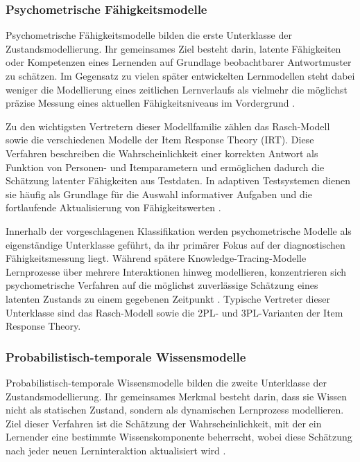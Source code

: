 \subsubsection{Psychometrische
Fähigkeitsmodelle}\label{psychometrische-fuxe4higkeitsmodelle}

Psychometrische Fähigkeitsmodelle bilden die erste Unterklasse der
Zustandsmodellierung. Ihr gemeinsames Ziel besteht darin, latente
Fähigkeiten oder Kompetenzen eines Lernenden auf Grundlage beobachtbarer
Antwortmuster zu schätzen. Im Gegensatz zu vielen später entwickelten
Lernmodellen steht dabei weniger die Modellierung eines zeitlichen
Lernverlaufs als vielmehr die möglichst präzise Messung eines aktuellen
Fähigkeitsniveaus im Vordergrund \citep{Han2018, Liu2024}.

Zu den wichtigsten Vertretern dieser Modellfamilie zählen das
Rasch-Modell sowie die verschiedenen Modelle der Item Response Theory
(IRT). Diese Verfahren beschreiben die Wahrscheinlichkeit einer
korrekten Antwort als Funktion von Personen- und Itemparametern und
ermöglichen dadurch die Schätzung latenter Fähigkeiten aus Testdaten. In
adaptiven Testsystemen dienen sie häufig als Grundlage für die Auswahl
informativer Aufgaben und die fortlaufende Aktualisierung von
Fähigkeitswerten \citep{Han2018, Liu2024}.

Innerhalb der vorgeschlagenen Klassifikation werden psychometrische
Modelle als eigenständige Unterklasse geführt, da ihr primärer Fokus auf
der diagnostischen Fähigkeitsmessung liegt. Während spätere
Knowledge-Tracing-Modelle Lernprozesse über mehrere Interaktionen hinweg
modellieren, konzentrieren sich psychometrische Verfahren auf die
möglichst zuverlässige Schätzung eines latenten Zustands zu einem
gegebenen Zeitpunkt \citep{Shen2024, Han2018}. Typische Vertreter dieser
Unterklasse sind das Rasch-Modell sowie die 2PL- und 3PL-Varianten der
Item Response Theory.

\subsubsection{Probabilistisch-temporale
Wissensmodelle}\label{probabilistisch-temporale-wissensmodelle}

Probabilistisch-temporale Wissensmodelle bilden die zweite Unterklasse
der Zustandsmodellierung. Ihr gemeinsames Merkmal besteht darin, dass
sie Wissen nicht als statischen Zustand, sondern als dynamischen
Lernprozess modellieren. Ziel dieser Verfahren ist die Schätzung der
Wahrscheinlichkeit, mit der ein Lernender eine bestimmte
Wissenskomponente beherrscht, wobei diese Schätzung nach jeder neuen
Lerninteraktion aktualisiert wird \citep{Shen2024, Abdelrahman2023}.

